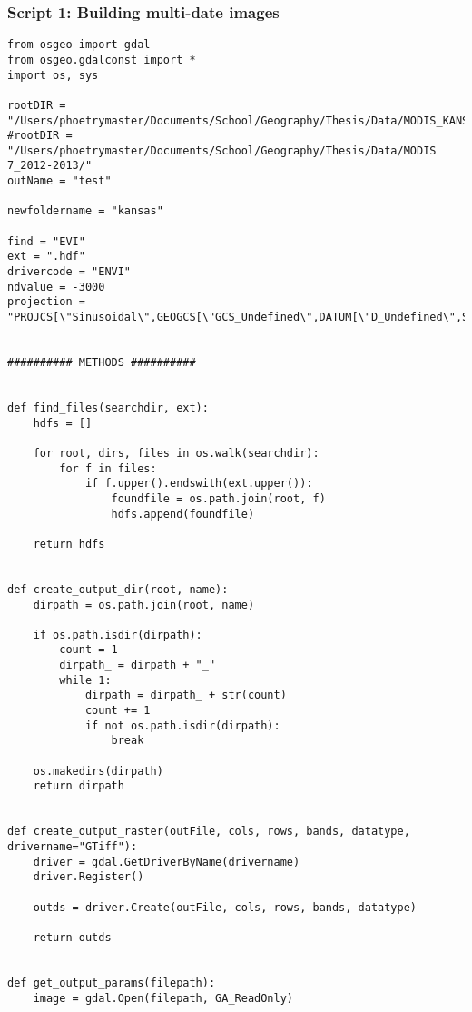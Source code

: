 \subsubsection*{Script 1: Building multi-date images}\label{script1}
\begin{verbatim}
from osgeo import gdal
from osgeo.gdalconst import *
import os, sys

rootDIR = "/Users/phoetrymaster/Documents/School/Geography/Thesis/Data/MODIS_KANSAS_2012/"
#rootDIR = "/Users/phoetrymaster/Documents/School/Geography/Thesis/Data/MODIS 7_2012-2013/"
outName = "test"

newfoldername = "kansas"

find = "EVI"
ext = ".hdf"
drivercode = "ENVI"
ndvalue = -3000
projection = "PROJCS[\"Sinusoidal\",GEOGCS[\"GCS_Undefined\",DATUM[\"D_Undefined\",SPHEROID[\"User_Defined_Spheroid\",6371007.181,0.0]],PRIMEM[\"Greenwich\",0.0],UNIT[\"Degree\",0.017453292519943295]],PROJECTION[\"Sinusoidal\"],PARAMETER[\"False_Easting\",0.0],PARAMETER[\"False_Northing\",0.0],PARAMETER[\"Central_Meridian\",0.0],UNIT[\"Meter\",1.0]]"


########## METHODS ##########


def find_files(searchdir, ext):
    hdfs = []

    for root, dirs, files in os.walk(searchdir):
        for f in files:
            if f.upper().endswith(ext.upper()):
                foundfile = os.path.join(root, f)
                hdfs.append(foundfile)

    return hdfs


def create_output_dir(root, name):
    dirpath = os.path.join(root, name)

    if os.path.isdir(dirpath):
        count = 1
        dirpath_ = dirpath + "_"
        while 1:
            dirpath = dirpath_ + str(count)
            count += 1
            if not os.path.isdir(dirpath):
                break

    os.makedirs(dirpath)
    return dirpath


def create_output_raster(outFile, cols, rows, bands, datatype, drivername="GTiff"):
    driver = gdal.GetDriverByName(drivername)
    driver.Register()

    outds = driver.Create(outFile, cols, rows, bands, datatype)

    return outds


def get_output_params(filepath):
    image = gdal.Open(filepath, GA_ReadOnly)


\end{verbatim}
